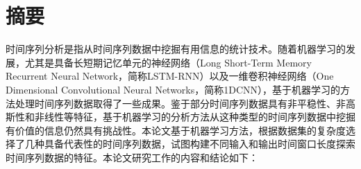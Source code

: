 \setlength{\headheight}{26pt}
\maketitle %
\MAKETITLE %
\makedeclaration %

\intobmk\chapter*{\texorpdfstring{摘\quad 要}{摘要}}
\setcounter{page}{1}
时间序列分析是指从时间序列数据中挖掘有用信息的统计技术。随着机器学习的发展，尤其是具备长短期记忆单元的神经网络（Long Short-Term Memory Recurrent Neural Network，简称LSTM-RNN）以及一维卷积神经网络（One Dimensional Convolutional Neural Networks，简称1DCNN），基于机器学习的方法处理时间序列数据取得了一些成果。鉴于部分时间序列数据具有非平稳性、非高斯性和非线性等特征，基于机器学习的分析方法从这种类型的时间序列数据中挖掘有价值的信息仍然具有挑战性。本论文基于机器学习方法，根据数据集的复杂度选择了几种具备代表性的时间序列数据，试图构建不同输入和输出时间窗口长度探索时间序列数据的特征。本论文研究工作的内容和结论如下：
